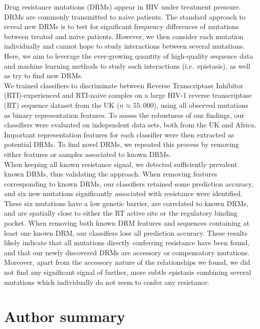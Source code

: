 \documentclass[
  11pt,
  twoside]{scrbook}
\begin{document}
Drug resistance mutations (DRMs) appear in HIV under treatment pressure.
DRMs are commonly transmitted to naive patients. The standard approach
to reveal new DRMs is to test for significant frequency differences of
mutations between treated and naive patients. However, we then consider
each mutation individually and cannot hope to study interactions between
several mutations. Here, we aim to leverage the ever-growing quantity of
high-quality sequence data and machine learning methods to study such
interactions (i.e.~epistasis), as well as try to find new DRMs.\\
We trained classifiers to discriminate between Reverse Transcriptase
Inhibitor (RTI)-experienced and RTI-naive samples on a large HIV-1
reverse transcriptase (RT) sequence dataset from the UK
(\(n\approx 55,000\)), using all observed mutations as binary
representation features. To assess the robustness of our findings, our
classifiers were evaluated on independent data sets, both from the UK
and Africa. Important representation features for each classifier were
then extracted as potential DRMs. To find novel DRMs, we repeated this
process by removing either features or samples associated to known
DRMs.\\
When keeping all known resistance signal, we detected sufficiently
prevalent known DRMs, thus validating the approach. When removing
features corresponding to known DRMs, our classifiers retained some
prediction accuracy, and six new mutations significantly associated with
resistance were identified. These six mutations have a low genetic
barrier, are correlated to known DRMs, and are spatially close to either
the RT active site or the regulatory binding pocket. When removing both
known DRM features and sequences containing at least one known DRM, our
classifiers lose all prediction accuracy. These results likely indicate
that all mutations directly conferring resistance have been found, and
that our newly discovered DRMs are accessory or compensatory mutations.
Moreover, apart from the accessory nature of the relationships we found,
we did not find any significant signal of further, more subtle epistasis
combining several mutations which individually do not seem to confer any
resistance.

\hypertarget{author-summary}{%
\section*{Author summary}\label{author-summary}}
\end{document}
